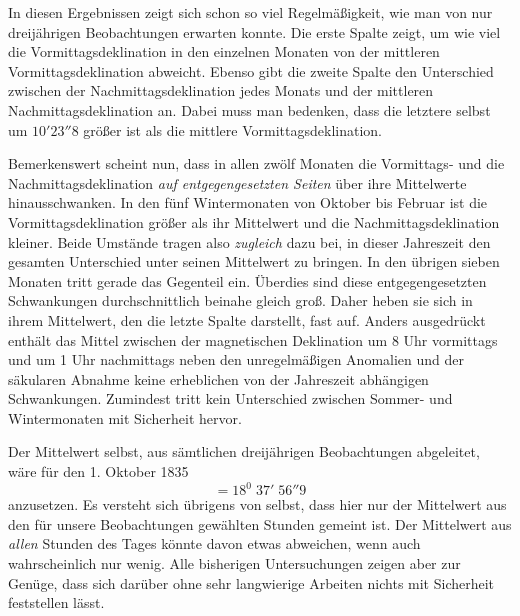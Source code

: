 In diesen Ergebnissen zeigt sich schon so viel Regelmäßigkeit, wie man von nur dreijährigen Beobachtungen erwarten konnte. Die erste Spalte zeigt, um wie viel die Vormittagsdeklination in den einzelnen Monaten von der mittleren Vormittagsdeklination abweicht. Ebenso gibt die zweite Spalte den Unterschied zwischen der Nachmittagsdeklination jedes Monats und der mittleren Nachmittagsdeklination an. Dabei muss man bedenken, dass die letztere selbst um $10'23''8$ größer ist als die mittlere Vormittagsdeklination.

Bemerkenswert scheint nun, dass in allen zwölf Monaten die Vormittags- und die Nachmittagsdeklination \textit{auf entgegengesetzten Seiten} über ihre Mittelwerte hinausschwanken. In den fünf Wintermonaten von Oktober bis Februar ist die Vormittagsdeklination größer als ihr Mittelwert und die Nachmittagsdeklination kleiner. Beide Umstände tragen also \textit{zugleich} dazu bei, in dieser Jahreszeit den gesamten Unterschied unter seinen Mittelwert zu bringen. In den übrigen sieben Monaten tritt gerade das Gegenteil ein. Überdies sind diese entgegengesetzten Schwankungen durchschnittlich beinahe gleich groß. Daher heben sie sich in ihrem Mittelwert, den die letzte Spalte darstellt, fast auf. Anders ausgedrückt enthält das Mittel zwischen der magnetischen Deklination um 8 Uhr vormittags und um 1 Uhr nachmittags
neben den unregelmäßigen Anomalien und der säkularen Abnahme keine erheblichen von der Jahreszeit abhängigen Schwankungen. Zumindest tritt kein Unterschied zwischen Sommer- und Wintermonaten mit Sicherheit hervor.

Der Mittelwert selbst, aus sämtlichen dreijährigen Beobachtungen abgeleitet, wäre für den 1. Oktober 1835
\[
=18^0\;37'\;56''9
\]
anzusetzen. Es versteht sich übrigens von selbst, dass hier nur der Mittelwert aus den für unsere Beobachtungen gewählten Stunden gemeint ist. Der Mittelwert aus \textit{allen} Stunden des Tages könnte davon etwas abweichen, wenn auch wahrscheinlich nur wenig. Alle bisherigen Untersuchungen zeigen aber zur Genüge, dass sich darüber ohne sehr langwierige Arbeiten nichts mit Sicherheit feststellen lässt.


